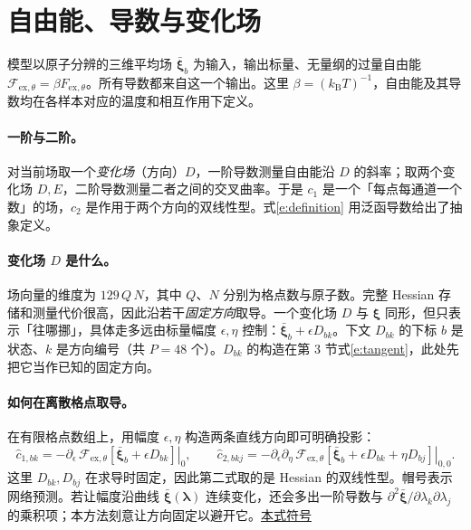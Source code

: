\documentclass[UTF8,fontset=none,10pt,a4paper]{ctexart}
\newcommand{\xiF}{\bm\xi}
\newcommand{\X}{\bar{\bm\xi}}
\newcommand{\ExT}{\mathcal F_{\mathrm{ex},\theta}}
\newcommand{\sd}[1]{\hfill\mbox{\footnotesize\hyperlink{sym:#1}{本式符号}}\par}
\begin{document}
\section*{自由能、导数与变化场}
模型以原子分辨的三维平均场 $\X_b$ 为输入，输出标量、无量纲的过量自由能 $\ExT=\beta F_{\mathrm{ex},\theta}$。所有导数都来自这一个输出。这里 $\beta=(k_{\mathrm B}T)^{-1}$，自由能及其导数均在各样本对应的温度和相互作用下定义。

\paragraph{一阶与二阶。} 对当前场取一个\emph{变化场}（方向）$D$，一阶导数测量自由能沿 $D$ 的斜率；取两个变化场 $D,E$，二阶导数测量二者之间的交叉曲率。于是 $c_1$ 是一个「每点每通道一个数」的场，$c_2$ 是作用于两个方向的双线性型。式\eqref{e:definition} 用泛函导数给出了抽象定义。

\paragraph{变化场 $D$ 是什么。} 场向量的维度为 $129\,Q\,N$，其中 $Q$、$N$ 分别为格点数与原子数。完整 Hessian 存储和测量代价很高，因此沿若干\emph{固定方向}取导。一个变化场 $D$ 与 $\xiF$ 同形，但只表示「往哪挪」，具体走多远由标量幅度 $\epsilon,\eta$ 控制：$\X_b+\epsilon D_{bk}$。下文 $D_{bk}$ 的下标 $b$ 是状态、$k$ 是方向编号（共 $P=48$ 个）。$D_{bk}$ 的构造在第 3 节式\eqref{e:tangent}，此处先把它当作已知的固定方向。

\paragraph{如何在离散格点取导。} 在有限格点数组上，用幅度 $\epsilon,\eta$ 构造两条直线方向即可明确投影：
\begin{equation}\label{e:project}
 \widehat c_{1,bk}=-\left.\partial_\epsilon\,
 \ExT[\X_b+\epsilon D_{bk}]\right|_{0},\qquad
 \widehat c_{2,bkj}=-\left.\partial_\epsilon\partial_\eta\,
 \ExT[\X_b+\epsilon D_{bk}+\eta D_{bj}]\right|_{0,0}.
\end{equation}
这里 $D_{bk},D_{bj}$ 在求导时固定，因此第二式取的是 Hessian 的双线性型。帽号表示网络预测。若让幅度沿曲线 $\X(\bm\lambda)$ 连续变化，还会多出一阶导数与 $\partial^2\X/\partial\lambda_k\partial\lambda_j$ 的乘积项；本方法刻意让方向固定以避开它。\sd{e:project}
\end{document}
